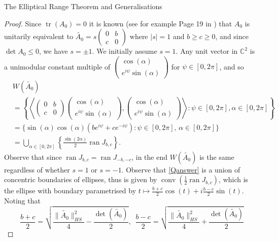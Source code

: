\documentclass[12pt]{article}
\theoremstyle{plain}
\theoremstyle{definition}
\theoremstyle{remark}
\newcommand{\ran}{\operatorname{ran}}
\numberwithin{equation}{section}
\begin{document}
\begin{section}{The Elliptical Range Theorem and Generalisations}
\begin{proof}
    Since $\operatorname{tr}(A_0) = 0$ it is known (see for example Page 19 in \cite{hornjohnson}) that $A_0$ is unitarily equivalent to $\tilde{A_0} = s \begin{pmatrix}
        0 & b \\
        c & 0 
    \end{pmatrix}$ where $|s| = 1$ and $b \geq c \geq 0$, and since $\det A_0 \leq 0$, we have $s = \pm 1$. We initially assume $s=1$. Any unit vector in $\mathbb{C}^2$ is a unimodular constant multiple of $\begin{pmatrix}
        \cos (\alpha) \\
        e^{i \psi} \sin (\alpha)
    \end{pmatrix}$ for $\psi \in [0, 2 \pi]$, and so
\begin{align}
&W(\tilde{A_0})\\
&= \left\{ \left\langle \begin{pmatrix}
        0 & b \\
        c & 0 
    \end{pmatrix}\begin{pmatrix}
        \cos (\alpha) \\
        e^{i \psi} \sin (\alpha)
    \end{pmatrix}, \begin{pmatrix}
        \cos (\alpha) \\
        e^{i \psi} \sin (\alpha)
    \end{pmatrix} \right\rangle  :  \psi \in [0, 2 \pi]   , \alpha \in [0, 2 \pi ]\right\}\\
    &= \{\sin (\alpha) \cos (\alpha) (be^{i \psi} +  c e^{-i \psi}) : \psi \in [0, 2 \pi] , \,   \alpha \in [0, 2 \pi ]  \} \\
    &= \bigcup_{\alpha \in [0, 2 \pi]} \left\{ \frac{\sin (2 \alpha)}{2} \ran J_{b,c} \right\} \label{Qanswer}.
\end{align}
Observe that since $\ran J_{b,c} = \ran J_{-b,-c} $, in the end $W(\tilde{A_0})$  is the same regardless of whether $s = 1$ or $s=-1$. Observe that \eqref{Qanswer} is a union of concentric boundaries of ellipses, thus is given by  $\operatorname{conv}(\frac{1}{2} \ran J_{b,c})$, which is the ellipse with boundary parametrised by $t \mapsto \frac{b+c}{2}  \cos (t) + i \frac{b-c}{2}  \sin (t)$. Noting that \begin{equation}\label{useforC}
    \frac{b+c}{2} = \sqrt{\frac{\|\tilde{A_0}\|_{HS}^2}{4} - \frac{\det(\tilde{A_0})}{2}}, \, \, \, \frac{b-c}{2} =  \sqrt{\frac{\|\tilde{A_0}\|_{HS}^2}{4} + \frac{\det(\tilde{A_0})}{2}}

\end{equation}
\end{proof}
\end{section}
\end{document}
